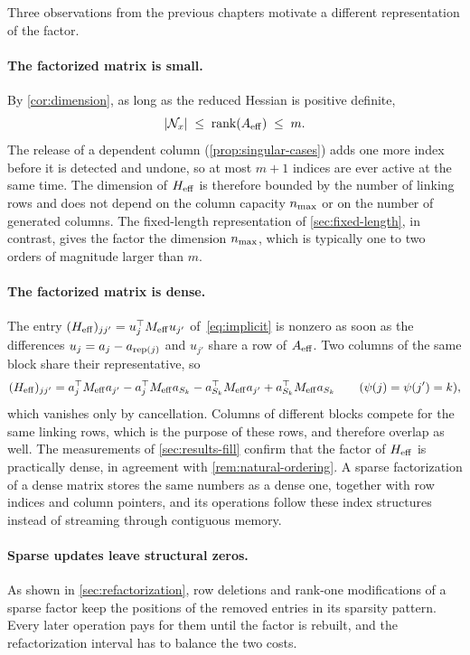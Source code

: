 Three observations from the previous chapters motivate a different representation of the
factor.

\paragraph{The factorized matrix is small.} By \cref{cor:dimension}, as long as the reduced
Hessian is positive definite,
\begin{equation} \label{eq:dense-size}
|\mathcal{N}_x|\;\le\;\operatorname{rank}(A_{\mathrm{eff}})\;\le\;m .
\end{equation}
The release of a dependent column (\cref{prop:singular-cases}) adds one more index before it is
detected and undone, so at most $m+1$ indices are ever active at the same time. The dimension of
$H_{\mathrm{eff}}$ is therefore bounded by the number of linking rows and does not depend on the column
capacity $n_{\max}$ or on the number of generated columns. The fixed-length representation of
\cref{sec:fixed-length}, in contrast, gives the factor the dimension $n_{\max}$, which is typically
one to two orders of magnitude larger than $m$.

\paragraph{The factorized matrix is dense.} The entry $(H_{\mathrm{eff}})_{jj'} = u_j^\top M_{\mathrm{eff}} u_{j'}$
of~\eqref{eq:implicit} is nonzero as soon as the differences $u_j = a_j - a_{\operatorname{rep}(j)}$ and
$u_{j'}$ share a row of $A_{\mathrm{eff}}$. Two columns of the same block share their representative, so
\[
(H_{\mathrm{eff}})_{jj'} = a_j^\top M_{\mathrm{eff}} a_{j'} - a_j^\top M_{\mathrm{eff}} a_{S_k} - a_{S_k}^\top M_{\mathrm{eff}} a_{j'}
+ a_{S_k}^\top M_{\mathrm{eff}} a_{S_k}
\qquad(\psi(j) = \psi(j') = k),
\]
which vanishes only by cancellation. Columns of different blocks compete for the same linking
rows, which is the purpose of these rows, and therefore overlap as well. The measurements of
\cref{sec:results-fill} confirm that the factor of $H_{\mathrm{eff}}$ is practically dense, in agreement
with \cref{rem:natural-ordering}. A sparse factorization of a dense matrix stores the same
numbers as a dense one, together with row indices and column pointers, and its operations
follow these index structures instead of streaming through contiguous memory.

\paragraph{Sparse updates leave structural zeros.} As shown in \cref{sec:refactorization}, row
deletions and rank-one modifications of a sparse factor keep the positions of the removed
entries in its sparsity pattern. Every later operation pays for them until the factor is
rebuilt, and the refactorization interval has to balance the two costs.

